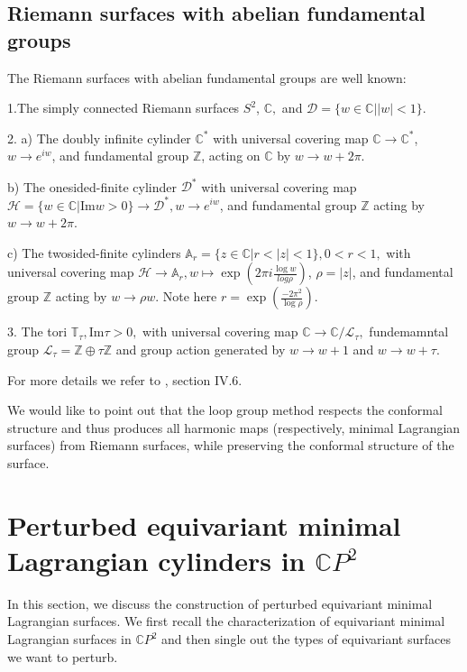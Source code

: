 \documentclass[a4paper,11pt]{amsart}
\theoremstyle{definition}
\numberwithin{equation}{section}
\newcommand{\C}{\mathbb{C}}
\begin{document}
\subsection{Riemann surfaces with abelian fundamental groups}
\label{sec:abelian pi_1}
The Riemann surfaces with abelian fundamental groups are well known:

1.The simply connected Riemann surfaces $S^2$, $\C,$ and  $\mathcal{D} = \{w\in\mathbb{C}| |w| < 1\}$.

2. a) The doubly infinite cylinder $\C^*$ with universal covering map $\C \rightarrow \C^*$, 
$w \rightarrow e^{iw}$, and fundamental group $\mathbb{Z}$,  acting on $\C$ by $w \rightarrow w + 2 \pi$.

     b) The onesided-finite cylinder $\mathcal{D}^*$ with universal covering map 
     $\mathcal{H} = \{w\in\mathbb{C}| \mathrm{Im} w >0 \} \rightarrow \mathcal{D}^*, w \rightarrow e^{iw}$, and fundamental group
     $\mathbb{Z}$ acting by  $w \rightarrow w + 2 \pi.$
 
     c) The twosided-finite cylinders $\mathbb{A}_r = \{z \in \C| r < |z| < 1\}, 0 < r <1,$ with universal covering map $\mathcal{H} 
     \rightarrow \mathbb{A}_r,
     w 
     \mapsto \exp(2 \pi i  \frac{\log w}{log \rho} )$, $\rho=|z|$, and fundamental group 
     $\mathbb{Z}$ acting by $w \rightarrow \rho w$. Note here $r = \exp(\frac{-2\pi^2}{\log \rho})$.
    
 3. The tori $\mathbb{T}_\tau, \mathrm{Im} \tau > 0, $ with universal covering map
  $\C \rightarrow \C / \mathcal{L}_\tau,$ fundemamntal group 
  $ \mathcal{L}_\tau = \mathbb{Z} \oplus \tau \mathbb{Z}$ and group action generated by
   $w \rightarrow w + 1$ and $w \rightarrow w + \tau$.
   
For more details we refer to \cite{Farkas-Kra}, section IV.6.
   
We would like to point out that the loop group method respects the conformal structure and thus produces all harmonic maps (respectively, minimal Lagrangian surfaces) from Riemann surfaces,
while preserving the conformal structure of the surface.


\section{Perturbed equivariant minimal Lagrangian cylinders in $\C P^2$}
\label{sec:pertubed}

In this section, we discuss the construction of perturbed equivariant  minimal Lagrangian surfaces. We first recall the characterization of equivariant minimal Lagrangian surfaces in $\mathbb{C}P^2$ and then single out the types of equivariant surfaces we want to perturb. 
\end{document}
